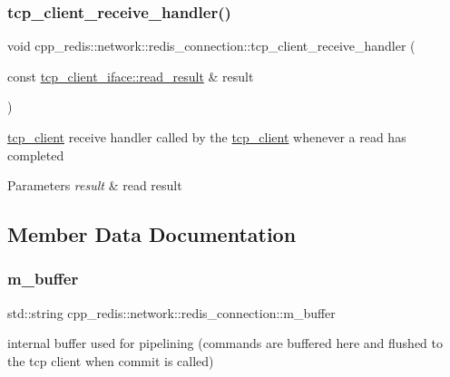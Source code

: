 \subsubsection{\texorpdfstring{tcp\+\_\+client\+\_\+receive\+\_\+handler()}{tcp\_client\_receive\_handler()}}
{\footnotesize\ttfamily void cpp\+\_\+redis\+::network\+::redis\+\_\+connection\+::tcp\+\_\+client\+\_\+receive\+\_\+handler (\begin{DoxyParamCaption}\item[{const \hyperlink{structcpp__redis_1_1network_1_1tcp__client__iface_1_1read__result}{tcp\+\_\+client\+\_\+iface\+::read\+\_\+result} \&}]{result }\end{DoxyParamCaption})\hspace{0.3cm}{\ttfamily [private]}}

\hyperlink{classcpp__redis_1_1network_1_1tcp__client}{tcp\+\_\+client} receive handler called by the \hyperlink{classcpp__redis_1_1network_1_1tcp__client}{tcp\+\_\+client} whenever a read has completed


\begin{DoxyParams}{Parameters}
{\em result} & read result \\
\hline
\end{DoxyParams}


\subsection{Member Data Documentation}
\mbox{\label{classcpp__redis_1_1network_1_1redis__connection_a6db8b0685d9fda7ad58b9011caeaa52f}} 
\subsubsection{\texorpdfstring{m\+\_\+buffer}{m\_buffer}}
{\footnotesize\ttfamily std\+::string cpp\+\_\+redis\+::network\+::redis\+\_\+connection\+::m\+\_\+buffer\hspace{0.3cm}{\ttfamily [private]}}

internal buffer used for pipelining (commands are buffered here and flushed to the tcp client when commit is called) \mbox{\label{classcpp__redis_1_1network_1_1redis__connection_a78212b9c1aa872ee0b322fcc3a995556}} 
